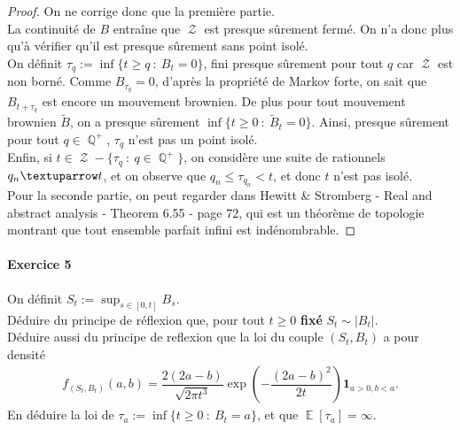 \documentclass{article}
\theoremstyle{definition}
\numberwithin{equation}{section}
\DeclareMathOperator{\Q}{\mathbb{Q}}
\DeclareMathOperator{\E}{\mathbb{E}}
\DeclareMathOperator{\Zz}{\mathcal{Z}}
\begin{document}
\begin{proof}
On ne corrige donc que la première partie.\\
La continuité de $B$ entraîne que $\Zz$ est presque sûrement fermé. On n'a donc plus qu'à vérifier qu'il est presque sûrement sans point isolé.\\
On définit $\tau_q:=\inf\{t\geq q~:~B_t=0\}$, fini presque sûrement pour tout $q$ car $\Zz$ est non borné. Comme $B_{\tau_q}=0$, d'après la propriété de Markov forte, on sait que $B_{t+\tau_q}$ est encore un mouvement brownien. De plus pour tout mouvement brownien $\tilde{B}$, on a presque sûrement $\inf\{t\geq 0~:~\tilde{B}_t=0\}$. Ainsi, presque sûrement pour tout $q\in\Q^+$, $\tau_q$ n'est pas un point isolé.\\
Enfin, si $t\in\Zz-\{\tau_q~:~q\in\Q^+\}$, on considère une suite de rationnels $q_n\textuparrow t$, et on observe que $q_n \leq \tau_{q_n}<t$, et donc $t$ n'est pas isolé.\\
Pour la seconde partie, on peut regarder dans Hewitt \& Stromberg - Real and abstract analysis - Theorem 6.55 - page 72, qui est un théorème de topologie montrant que tout ensemble parfait infini est indénombrable. 
\end{proof}



\paragraph{Exercice 5}
On définit $S_t := \sup_{s\in[0,t]}B_s$.\\
Déduire du principe de réflexion que, pour tout $t\geq 0$ \textbf{fixé} $S_t\sim |B_t|$.\\
Déduire aussi du principe de reflexion que la loi du couple $(S_t,B_t)$ a pour densité
\begin{align}
\label{2}
    f_{(S_t,B_t)}(a,b)=\dfrac{2(2a-b)}{\sqrt{2\pi t^3}}\exp\left(-\dfrac{(2a-b)^2}{2t}\right)\mathbf{1}_{a>0,b<a}.
\end{align}
En déduire la loi de $\tau_a:=\inf\{t\geq 0~:~B_t=a\}$, et que $\E[\tau_a]=\infty$.
\end{document}
